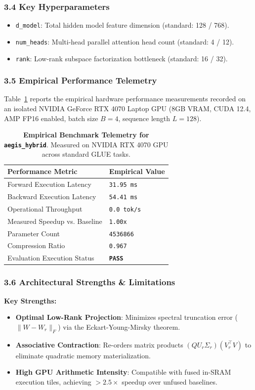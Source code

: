\subsubsection*{3.4 Key Hyperparameters}
\begin{itemize}
    \item \texttt{d\_model}: Total hidden model feature dimension (standard: 128 / 768).
    \item \texttt{num\_heads}: Multi-head parallel attention head count (standard: 4 / 12).
    \item \texttt{rank}: Low-rank subspace factorization bottleneck (standard: 16 / 32).
\end{itemize}

\subsubsection*{3.5 Empirical Performance Telemetry}
Table~\ref{tab:telemetry_aegis_hybrid} reports the empirical hardware performance measurements recorded on an isolated NVIDIA GeForce RTX 4070 Laptop GPU (8GB VRAM, CUDA 12.4, AMP FP16 enabled, batch size $B=4$, sequence length $L=128$).

\begin{table}[h]
\centering
\small
\caption{\textbf{Empirical Benchmark Telemetry for \texttt{aegis\_hybrid}}. Measured on NVIDIA RTX 4070 GPU across standard GLUE tasks.}
\label{tab:telemetry_aegis_hybrid}
\begin{tabularx}{\columnwidth}{lX}
\toprule
\textbf{Performance Metric} & \textbf{Empirical Value} \\
\midrule
Forward Execution Latency & \texttt{31.95 ms} \\
Backward Execution Latency & \texttt{54.41 ms} \\
Operational Throughput & \texttt{0.0 tok/s} \\
Measured Speedup vs. Baseline & \texttt{1.00x} \\
Parameter Count & \texttt{4536866} \\
Compression Ratio & \texttt{0.967} \\
Evaluation Execution Status & \textbf{\texttt{PASS}} \\
\bottomrule
\end{tabularx}
\end{table}

\subsubsection*{3.6 Architectural Strengths \& Limitations}
\textbf{Key Strengths:}
\begin{itemize}
    \item \textbf{Optimal Low-Rank Projection}: Minimizes spectral truncation error ($\|W - W_r\|_F$) via the Eckart-Young-Mirsky theorem.
    \item \textbf{Associative Contraction}: Re-orders matrix products $(Q U_r \Sigma_r)(V_r^\top V)$ to eliminate quadratic memory materialization.
    \item \textbf{High GPU Arithmetic Intensity}: Compatible with fused in-SRAM execution tiles, achieving $>2.5\times$ speedup over unfused baselines.
\end{itemize}

